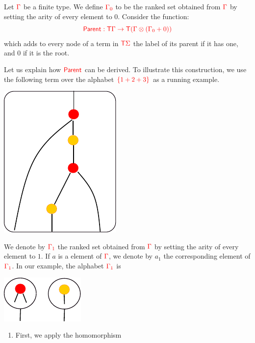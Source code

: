 \noindent \begin{example}\label{ex:sibling}  Let ${\color{red}{\Gamma}}$ be a finite type. We define ${\color{red}{{\color{red}{\Gamma}}_0}}$  to be the ranked set obtained from ${\color{red}{\Gamma}}$ by setting the arity of every element to $0$.  
\medskip
Consider the function:
$${\color{red}{ \mathsf{Parent}: {\color{red}{\mathsf T}}{\color{red}{\Gamma}}\to {\color{red}{\mathsf T}}({\color{red}{\Gamma}}\otimes ({\color{red}{\Gamma}}_0+0))}}$$
which adds to every node of a term in ${\color{red}{\mathsf T}} {\color{red}{\Sigma}}$ the label  of its parent if it has one, and $0$ if it is the root.

Let us explain how ${\color{red}{\mathsf{Parent}}}$ can be derived. To illustrate this construction, we use the following term over the alphabet ${\color{red}{\{1+2+3\}}}$ as a running example.
\begin{center}
		 \includegraphics[scale=.6]{parent-1.pdf}
		\end{center}
We denote by ${\color{red}{\Gamma_1}}$ the ranked set obtained from ${\color{red}{\Gamma}}$ by setting the arity of every element to $1$. If $a$ is a element of ${\color{red}{\Gamma}}$, we denote by $a_1$ the corresponding element of ${\color{red}{\Gamma_1}}$. In our example, the alphabet ${\color{red}{\Gamma_1}}$ is
\begin{center}
		\includegraphics[scale=.5]{parent-2.pdf}
		\end{center}
\begin{enumerate}
\item  First, we apply the homomorphism 

\end{enumerate}
\end{example}
